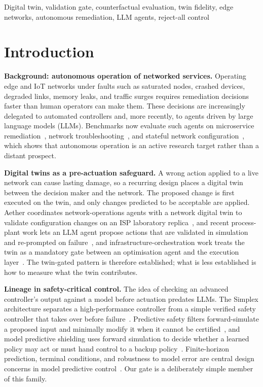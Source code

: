\documentclass[conference]{IEEEtran}
\begin{document}
\begin{IEEEkeywords}
Digital twin, validation gate, counterfactual evaluation, twin fidelity, edge networks, autonomous remediation, LLM agents, reject-all control
\end{IEEEkeywords}

\section{Introduction}

\textbf{Background: autonomous operation of networked services.} Operating edge and IoT networks under faults such as saturated nodes, crashed devices, degraded links, memory leaks, and traffic surges requires remediation decisions faster than human operators can make them. These decisions are increasingly delegated to automated controllers and, more recently, to agents driven by large language models (LLMs). Benchmarks now evaluate such agents on microservice remediation~\cite{microremed}, network troubleshooting~\cite{nika}, and stateful network configuration~\cite{netagentbench}, which shows that autonomous operation is an active research target rather than a distant prospect.

\textbf{Digital twins as a pre-actuation safeguard.} A wrong action applied to a live network can cause lasting damage, so a recurring design places a digital twin between the decision maker and the network. The proposed change is first executed on the twin, and only changes predicted to be acceptable are applied. Aether coordinates network-operations agents with a network digital twin to validate configuration changes on an ISP laboratory replica~\cite{aether}, and recent process-plant work lets an LLM agent propose actions that are validated in simulation and re-prompted on failure~\cite{processplant}, and infrastructure-orchestration work treats the twin as a mandatory gate between an optimisation agent and the execution layer~\cite{twingatedorch}. The twin-gated pattern is therefore established; what is less established is how to measure what the twin contributes.

\textbf{Lineage in safety-critical control.} The idea of checking an advanced controller's output against a model before actuation predates LLMs. The Simplex architecture separates a high-performance controller from a simple verified safety controller that takes over before failure~\cite{bbsimplex}. Predictive safety filters forward-simulate a proposed input and minimally modify it when it cannot be certified~\cite{wabersich}, and model predictive shielding uses forward simulation to decide whether a learned policy may act or must hand control to a backup policy~\cite{dmps}. Finite-horizon prediction, terminal conditions, and robustness to model error are central design concerns in model predictive control~\cite{mpcreview}. Our gate is a deliberately simple member of this family.
\end{document}
